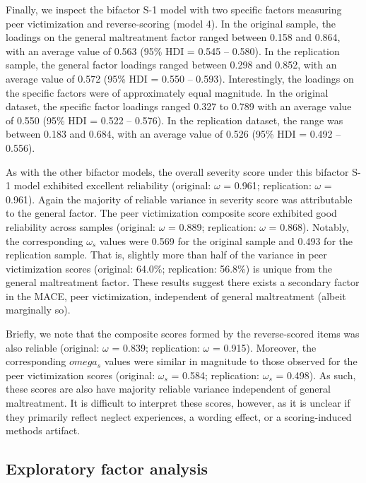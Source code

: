 \documentclass[letterpaper,man,natbib,floatsintext,longtable]{apa6}
\begin{document}
Finally, we inspect the bifactor S-1 model with two specific factors measuring peer victimization and reverse-scoring (model 4). In the original sample, the loadings on the general maltreatment factor ranged between 0.158 and 0.864, with an average value of 0.563 (95\% HDI = 0.545 -- 0.580). In the replication sample, the general factor loadings ranged between 0.298 and 0.852, with an average value of 0.572 (95\% HDI = 0.550 -- 0.593). Interestingly, the loadings on the specific factors were of approximately equal magnitude. In the original dataset, the specific factor loadings ranged 0.327 to 0.789 with an average value of 0.550 (95\% HDI = 0.522 -- 0.576). In the replication dataset, the range was between 0.183 and 0.684, with an average value of 0.526 (95\% HDI = 0.492 -- 0.556). 

As with the other bifactor models, the overall severity score under this bifactor S-1 model exhibited excellent reliability (original: $\omega$ = 0.961; replication: $\omega$ = 0.961). Again the majority of reliable variance in severity score was attributable to the general factor. The peer victimization composite score exhibited good reliability across samples (original: $\omega$ = 0.889; replication: $\omega$ = 0.868). Notably, the corresponding $\omega_s$ values were 0.569 for the original sample and 0.493 for the replication sample. That is, slightly more than half of the variance in peer victimization scores (original: 64.0\%; replication: 56.8\%) is unique from the general maltreatment factor. These results suggest there exists a secondary factor in the MACE, peer victimization, independent of general maltreatment (albeit marginally so). 

Briefly, we note that the composite scores formed by the reverse-scored items was also reliable (original: $\omega$ = 0.839; replication: $\omega$ = 0.915). Moreover, the corresponding $omega_s$ values were similar in magnitude to those observed for the peer victimization scores (original: $\omega_s$ = 0.584; replication: $\omega_s$ = 0.498). As such, these scores are also have majority reliable variance independent of general maltreatment. It is difficult to interpret these scores, however, as it is unclear if they primarily reflect neglect experiences, a wording effect, or a scoring-induced methods artifact. 

\subsection{Exploratory factor analysis}
\end{document}
